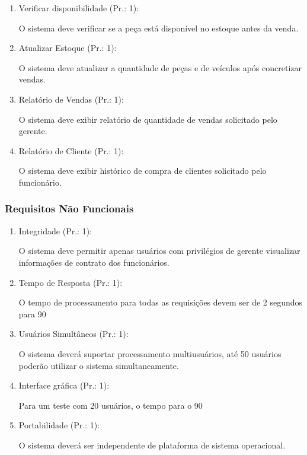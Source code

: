 \begin{enumerate}[
	label=RF\arabic{*}, 
	ref=(RF\arabic{*}),
	leftmargin=1.5em,
	itemindent=4.5em]
\item Verificar disponibilidade (Pr.: 1):\par
O sistema deve verificar se a peça está disponível no estoque antes da venda.\par

\item Atualizar Estoque (Pr.: 1):\par
O sistema deve atualizar a quantidade de peças e de veículos após concretizar vendas.\par

\item Relatório de Vendas (Pr.: 1):\par
O sistema deve exibir relatório de quantidade de vendas solicitado pelo gerente.\par

\item Relatório de Cliente (Pr.: 1):\par
O sistema deve exibir histórico de compra de clientes solicitado pelo funcionário. \par


\end{enumerate}

\subsubsection{Requisitos Não Funcionais}



\begin{enumerate}[
	label=RNF\arabic{*}, 
	ref=(RNF\arabic{*}),
	leftmargin=1.5em,
	itemindent=4.5em]
	
	\item Integridade (Pr.: 1):\par
	O sistema deve permitir apenas usuários com privilégios de gerente visualizar informações de contrato dos funcionários.\par
	
	\item Tempo de Resposta (Pr.: 1):\par
	O tempo de processamento para todas as requisições devem ser de 2 segundos para  90%
	
	\item Usuários Simultâneos (Pr.: 1):\par
	O sistema deverá suportar processamento multiusuários, até 50 usuários poderão utilizar o sistema simultaneamente. \par
	
	\item Interface gráfica (Pr.: 1):\par
	Para um teste com 20 usuários, o tempo para o 90%
	
	\item Portabilidade (Pr.: 1):\par
	O sistema deverá ser independente de plataforma de sistema operacional. \par
\end{enumerate}
